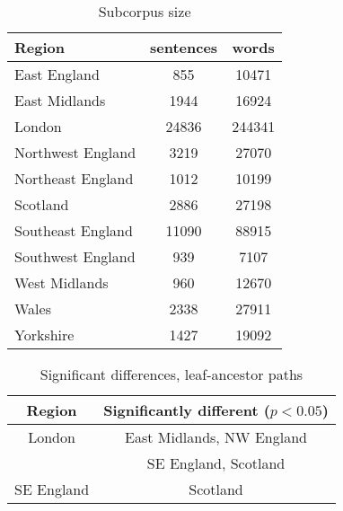 \documentclass[11pt,letterpaper]{article}
\begin{document}
\begin{table}
\begin{tabular}{|lcc|} \hline
Region & sentences & words \\
\hline \hline
 East England & 855 & 10471 \\ \hline
 East Midlands & 1944 & 16924 \\ \hline
 London & 24836& 244341 \\ \hline
 Northwest England & 3219 & 27070 \\ \hline
 Northeast England &  1012 & 10199 \\ \hline
 Scotland & 2886 & 27198 \\ \hline
 Southeast England & 11090  & 88915 \\ \hline
 Southwest England & 939 & 7107 \\ \hline
 West Midlands &  960 &  12670 \\ \hline
 Wales & 2338 & 27911 \\ \hline
 Yorkshire & 1427 & 19092 \\ \hline
\end{tabular}
\caption{Subcorpus size}
\label{size}
\end{table}

\begin{table}
  \begin{tabular}{|c|c|} \hline %
    Region & Significantly different ($p < 0.05$) \\ \hline
    London & East Midlands, NW England \\
    & SE England, Scotland \\ \hline
    SE England & Scotland \\ \hline
  \end{tabular}
\caption{Significant differences, leaf-ancestor paths}
  \label{diffs}
\end{table}
\end{document}
